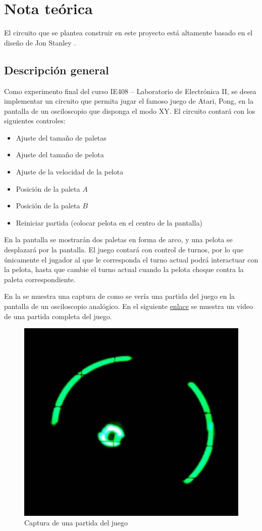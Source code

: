 \section{Nota teórica}
El circuito que se plantea construir en este proyecto está altamente basado en el diseño de Jon Stanley \cite{pong}.

\subsection{Descripción general}
Como experimento final del curso IE408 -- Laboratorio de Electrónica II, se desea implementar un circuito que permita jugar el famoso juego de Atari, Pong, en la pantalla de un osciloscopio que disponga el modo XY.
El circuito contará con los siguientes controles:
\begin{itemize}
    \item Ajuste del tamaño de paletas
    \item Ajuste del tamaño de pelota
    \item Ajuste de la velocidad de la pelota
    \item Posición de la paleta $A$
    \item Posición de la paleta $B$
    \item Reiniciar partida (colocar pelota en el centro de la pantalla)
\end{itemize}
En la pantalla se mostrarán dos paletas en forma de arco, y una pelota se desplazará por la pantalla.
El juego contará con control de turnos, por lo que únicamente el jugador al que le corresponda el turno actual podrá interactuar con la pelota, hasta que cambie el turno actual cuando la pelota choque contra la paleta correspondiente. 

En la  se muestra una captura de como se vería una partida del juego en la pantalla de un osciloscopio analógico. 
En el siguiente \href{https://vimeo.com/671230800}{enlace} se muestra un video de una partida completa del juego. 

\begin{figure}[H]
    \centering
    \includegraphics[width=0.5\linewidth]{figs/descripcion/juego.png}
    \caption{Captura de una partida del juego \cite{pong}}
    \label{ejemploJuego}
\end{figure}
